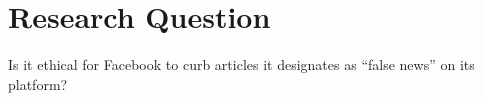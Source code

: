 
\section{Research Question}

Is it ethical for Facebook to curb articles it designates as ``false news'' on its platform?